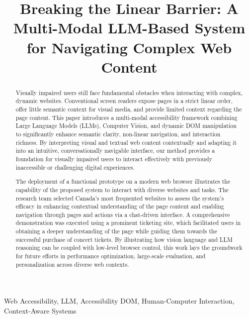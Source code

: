 \documentclass[conference]{IEEEtran}
\begin{document}
\renewcommand{\figurename}{Figure}


\title{Breaking the Linear Barrier: A Multi-Modal LLM-Based System for Navigating Complex Web Content}



\maketitle

\begin{abstract}
Visually impaired users still face fundamental obstacles when interacting with complex, dynamic websites. Conventional screen readers expose pages in a strict linear order, offer little semantic context for visual media, and provide limited context regarding the page content. This paper introduces a multi-modal accessibility framework combining Large Language Models (LLMs), Computer Vision, and dynamic DOM manipulation to significantly enhance semantic clarity, non-linear navigation, and interaction richness. By interpreting visual and textual web content contextually and adapting it into an intuitive, conversationally navigable interface, our method provides a foundation for visually impaired users to interact effectively with previously inaccessible or challenging digital experiences.

The deployment of a functional prototype on a modern web browser illustrates the capability of the proposed system to interact with diverse websites and tasks. The research team selected Canada's most frequented websites to assess the system's efficacy in enhancing contextual understanding of the page content and enabling navigation through pages and actions via a chat-driven interface. A comprehensive demonstration was executed using a prominent ticketing site, which facilitated users in obtaining a deeper understanding of the page while guiding them towards the successful purchase of concert tickets. By illustrating how vision language and LLM reasoning can be coupled with low‑level browser control, this work lays the groundwork for future efforts in performance optimization, large‑scale evaluation, and personalization across diverse web contexts.
\end{abstract}

\begin{IEEEkeywords}
Web Accessibility, LLM, Accessibility DOM, Human-Computer Interaction, Context-Aware Systems
\end{IEEEkeywords}
\end{document}
